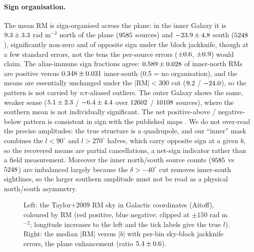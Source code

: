 \documentclass[twocolumn]{aastex631}
\begin{document}
\paragraph{Sign organisation.} The mean RM is sign-organised across the plane: in the inner
Galaxy it is $9.3\pm3.3$ rad m$^{-2}$ north of the plane
($9585$ sources) and $-23.9\pm4.8$ south ($5248$), significantly non-zero and of opposite sign under the block jackknife, though at a few standard
errors, not the tens the per-source errors ($\pm0.6$, $\pm0.9$) would
claim. The alias-immune sign fractions agree: $0.589\pm0.028$ of
inner-north RMs are positive versus $0.348\pm0.031$ inner-south
(0.5 = no organisation), and the means are essentially unchanged under the $|\mathrm{RM}|<300$
cut ($9.2$ / $-24.0$), so the pattern is not carried by
$n\pi$-aliased outliers. The outer Galaxy shows the same, weaker sense
($5.1\pm2.3$ / $-6.4\pm4.4$ over
$12602$ / $10108$ sources), where the southern mean is not individually
significant. The net positive-above / negative-below pattern is consistent in sign with the
published maps \citep{taylor2009,sun2008}. We do not over-read the precise amplitudes: the true
structure is a quadrupole, and our ``inner'' mask combines the $l<90^\circ$ and $l>270^\circ$
halves, which carry opposite sign at a given $b$, so the recovered means are partial
cancellations, a net-sign indicator rather than a field measurement. Moreover the inner
north/south source counts ($9585$ vs $5248$) are imbalanced largely because
the $\delta>-40^\circ$ cut removes inner-south sightlines, so the larger southern amplitude must
not be read as a physical north/south asymmetry.

\begin{figure}
\caption{Left: the Taylor+2009 RM sky in Galactic coordinates (Aitoff), coloured by RM
(red positive, blue negative; clipped at $\pm150$ rad m$^{-2}$; longitude increases to the
left and the tick labels give the true $l$). Right: the median $|\mathrm{RM}|$ versus $|b|$
with per-bin sky-block jackknife errors, the plane enhancement (ratio
$5.4\pm0.6$).}
\label{fig:rmsky}
\end{figure}
\end{document}
